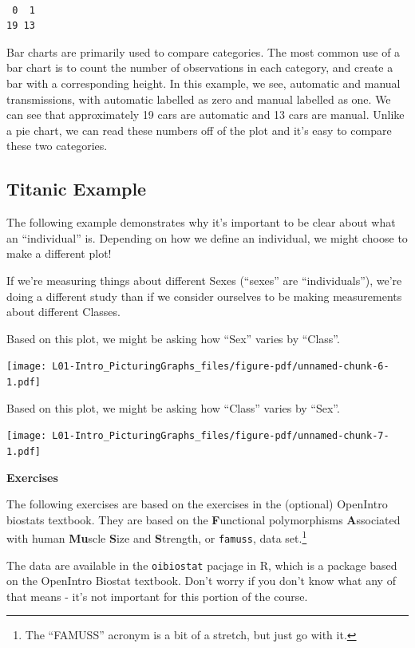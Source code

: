 \documentclass[
  letterpaper,
  DIV=11,
  numbers=noendperiod,
  oneside]{scrreprt}
\begin{document}
\begin{verbatim}

 0  1 
19 13 
\end{verbatim}

Bar charts are primarily used to compare categories. The most common use
of a bar chart is to count the number of observations in each category,
and create a bar with a corresponding height. In this example, we see,
automatic and manual transmissions, with automatic labelled as zero and
manual labelled as one. We can see that approximately 19 cars are
automatic and 13 cars are manual. Unlike a pie chart, we can read these
numbers off of the plot and it's easy to compare these two categories.

\hypertarget{titanic-example}{%
\subsection{Titanic Example}\label{titanic-example}}

The following example demonstrates why it's important to be clear about
what an ``individual'' is. Depending on how we define an individual, we
might choose to make a different plot!

If we're measuring things about different Sexes (``sexes'' are
``individuals''), we're doing a different study than if we consider
ourselves to be making measurements about different Classes.

Based on this plot, we might be asking how ``Sex'' varies by ``Class''.

\texttt{[image: L01-Intro\_PicturingGraphs\_files/figure-pdf/unnamed-chunk-6-1.pdf]}

Based on this plot, we might be asking how ``Class'' varies by ``Sex''.

\texttt{[image: L01-Intro\_PicturingGraphs\_files/figure-pdf/unnamed-chunk-7-1.pdf]}

\textbf{Exercises}

The following exercises are based on the exercises in the (optional)
OpenIntro biostats textbook. They are based on the \textbf{F}unctional
polymorphisms \textbf{A}ssociated with human \textbf{Mu}scle
\textbf{S}ize and \textbf{S}trength, or \texttt{famuss}, data
set.\footnote{The ``FAMUSS'' acronym is a bit of a stretch, but just go
  with it.}

The data are available in the \texttt{oibiostat} pacjage in R, which is
a package based on the OpenIntro Biostat textbook. Don't worry if you
don't know what any of that means - it's not important for this portion
of the course.
\end{document}
